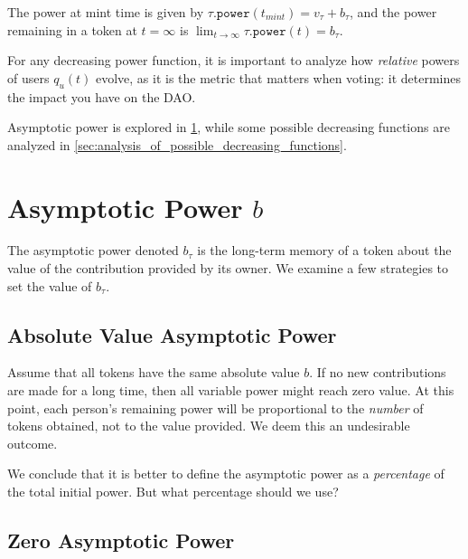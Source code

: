 The power at mint time is given by $\tau\mathtt{.power}(t_{mint}) = v_\tau + b_\tau$, and the power remaining in a token at $t=\infty$ is $\lim_{t\rightarrow\infty}\tau\mathtt{.power}(t) = b_\tau$.

For any decreasing power function, it is important to analyze how \emph{relative} powers of users $q_u(t)$ evolve, as it is the metric that matters when voting: it determines the impact you have on the DAO.

Asymptotic power is explored in \cref{sec:asymptotic_power}, while some possible decreasing functions are analyzed in \cref{sec:analysis_of_possible_decreasing_functions}.

\section{Asymptotic Power $b$}
\label{sec:asymptotic_power}

The asymptotic power denoted $b_\tau$ is the long-term memory of a token about the value of the contribution provided by its owner.
We examine a few strategies to set the value of $b_\tau$.

\subsection{Absolute Value Asymptotic Power}

\begin{proposition}
  Assume that all tokens have the same absolute value $b$.
  If no new contributions are made for a long time, then all variable power might reach zero value.
  At this point, each person's remaining power will be proportional to the \emph{number} of tokens obtained, not to the value provided.
  We deem this an undesirable outcome.
\end{proposition}

We conclude that it is better to define the asymptotic power as a \emph{percentage} of the total initial power.
But what percentage should we use?

\subsection{Zero Asymptotic Power}

